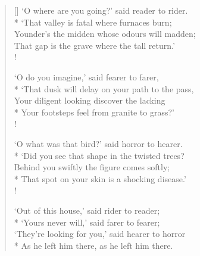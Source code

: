 \documentclass[MAIN]{subfiles}
\begin{document}
\settowidth{\versewidth}{`O where are you going?' said reader to rider.}
\begin{verse}[\versewidth]
`O where are you going?' said reader to rider.\\*
`That valley is fatal where furnaces burn;\\
Younder's the midden whose odours will madden;\\
That gap is the grave where the tall return.'\\!

`O do you imagine,' said fearer to farer,\\*
`That dusk will delay on your path to the pass,\\
Your diligent looking discover the lacking\\*
Your footsteps feel from granite to grass?'\\!

`O what was that bird?' said horror to hearer.\\*
`Did you see that shape in the twisted trees?\\
Behind you swiftly the figure comes softly;\\*
That spot on your skin is a shocking disease.'\\!

`Out of this house,' said rider to reader;\\*
`Yours never will,' said farer to fearer;\\
`They're looking for you,' said hearer to horror\\*
As he left him there, as he left him there.
\end{verse}
\end{document}
